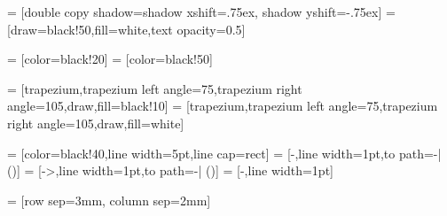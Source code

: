  = [double copy shadow={shadow xshift=.75ex, shadow yshift=-.75ex}]
 = [draw=black!50,fill=white,text opacity=0.5]

 = [color=black!20]
 = [color=black!50]

\newcommand{\dataRightAngle}{105}
\newcommand{\dataLeftAngle}{75}

 = [trapezium,trapezium left angle=\dataLeftAngle,trapezium right angle=\dataRightAngle,draw,fill=black!10]
 = [trapezium,trapezium left angle=\dataLeftAngle,trapezium right angle=\dataRightAngle,draw,fill=white]

 = [color=black!40,line width=5pt,line cap=rect]
 = [-,line width=1pt,to path={-| (\tikztotarget)}]
 = [->,line width=1pt,to path={-| (\tikztotarget)}]
 = [-,line width=1pt]

 = [row sep=3mm, column sep=2mm]



\newcommand{\MultilineComponent}[2]
{
	\begin{minipage}{#1}
	\begin{center}
		#2
	\end{center}
	\end{minipage}
}

\newcommand{\TwolineComponent}[3]
{
	\begin{minipage}{#1}
	\begin{center}
		#2 \linebreak #3
	\end{center}
	\end{minipage}
}

\newcommand{\ThreelineComponent}[4]
{
	\begin{minipage}{#1}
	\begin{center}
		#2 \linebreak #3 \linebreak #4
	\end{center}
	\end{minipage}
}

